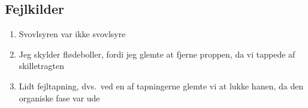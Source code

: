 \subsection*{Fejlkilder}
\begin{enumerate}
	\item Svovlsyren var ikke svovlsyre 
	\item Jeg skylder flødeboller, fordi jeg glemte at
		fjerne proppen, da vi tappede af skilletragten
	\item Lidt fejltapning, dvs.~ved en af tapningerne
		glemte vi at lukke hanen, da den organiske fase
		var ude
\end{enumerate}
